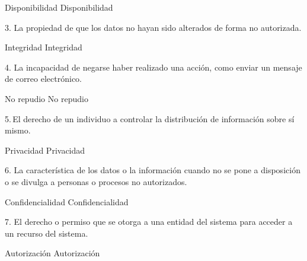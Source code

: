 Disponibilidad
   Disponibilidad

3. La propiedad de que los datos no hayan sido alterados de forma no autorizada.


Integridad
   Integridad

4. La incapacidad de negarse haber realizado una acción, como enviar un mensaje de correo electrónico.


No repudio
   No repudio

5. El derecho de un individuo a controlar la distribución de información sobre sí mismo.


Privacidad
   Privacidad

6. La característica de los datos o la información cuando no se pone a disposición o se divulga a personas o procesos no autorizados.


Confidencialidad
   Confidencialidad

7. El derecho o permiso que se otorga a una entidad del sistema para acceder a un recurso del sistema.


Autorización
   Autorización